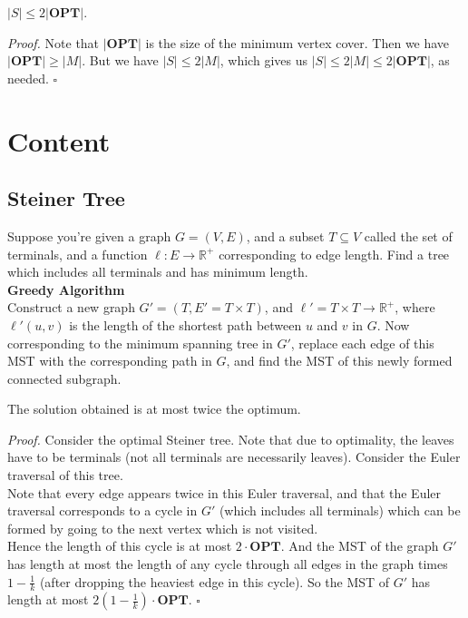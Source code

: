 \documentclass[a4paper]{article}
\newenvironment{proof}{\begin{breakbox}\textit{Proof.}}{\hfill$\square$\end{breakbox}}
\newcommand{\nl}{\vspace{0.2cm}\\}
\newcommand{\OPT}{\mathbf{OPT}}
\begin{document}
\begin{claim}
    $|S| \le 2 |\OPT|$.
\end{claim}
\begin{proof}
    Note that $|\OPT|$ is the size of the minimum vertex cover. Then we have $|\OPT| \ge |M|$. But we have $|S| \le 2|M|$, which gives us $|S| \le 2|M| \le 2|\OPT|$, as needed. 
\end{proof}

\section{Content}

\subsection{Steiner Tree}

Suppose you're given a graph $G = (V, E)$, and a subset $T \subseteq V$ called the set of terminals, and a function $\ell : E \to \mathbb{R}^+$ corresponding to edge length. Find a tree which includes all terminals and has
minimum length.\nl

\textbf{Greedy Algorithm}\nl
Construct a new graph $G' = (T, E' = T \times T)$, and $\ell' = T \times T \to \mathbb{R}^+$, where $\ell'(u, v)$ is the length of the shortest path between $u$ and $v$ in $G$. Now
corresponding to the minimum spanning tree in $G'$, replace each edge of this MST with the corresponding path in $G$, and find the MST of this newly formed connected subgraph.\nl
\begin{claim}
    The solution obtained is at most twice the optimum.
\end{claim}
\begin{proof}
    Consider the optimal Steiner tree. Note that due to optimality, the leaves have to be terminals (not all terminals are necessarily leaves). Consider the Euler traversal of this tree.\nl
    Note that every edge appears twice in this Euler traversal, and that the Euler traversal corresponds to a cycle in $G'$ (which includes all terminals) which can be formed by going to the next
    vertex which is not visited.\nl
    Hence the length of this cycle is at most $2 \cdot \OPT$. And the MST of the graph $G'$ has length at most the length of any cycle through all edges in the graph times $1 - \frac{1}{k}$ (after
    dropping the heaviest edge in this cycle). So the MST of
    $G'$ has length at most $2\left(1 - \frac{1}{k}\right) \cdot \OPT$.
\end{proof}
\end{document}
